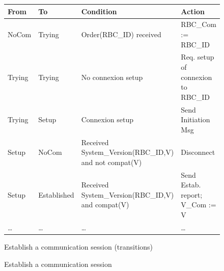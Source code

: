 \documentclass{template/openetcs_article}
\begin{document}
\begin{figure}
\centering
\small
\begin{tabular}{|l|l||p{3.5cm}|p{3.5cm}|}
\hline
\bf From & \bf To & \bf Condition & \bf Action \\
\hline
NoCom & Trying & Order(RBC\_ID) received & RBC\_Com := RBC\_ID \\
\hline
Trying & Trying & No connexion setup & Req. setup of connexion to RBC\_ID \\
\hline
Trying & Setup & Connexion setup & Send Initiation Msg \\
\hline
Setup & NoCom & Received System\_Version(RBC\_ID,V) and not compat(V)  & Disconnect\\
\hline
Setup & Established & Received System\_Version(RBC\_ID,V) and compat(V) & 
		Send Estab. report; V\_Com := V  \\
\hline
\dots & \dots & \dots & \dots  \\
\hline
\end{tabular}
\normalsize
\caption{Establish a communication session (transitions)}
\label{fig:establish_tab}
\end{figure}

\begin{figure}
  \centering
  \caption{Establish a communication session}
  \label{fig:establish}
\end{figure}
\end{document}
